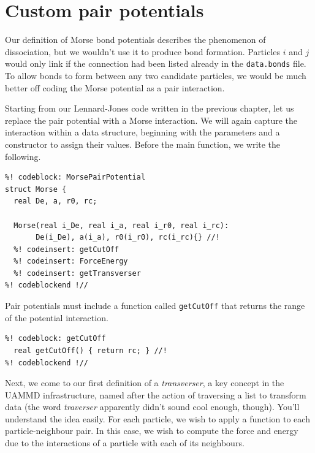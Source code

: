 \section{\label{Custom_pair_potentials}Custom pair potentials}

Our definition of Morse bond potentials describes the phenomenon of
dissociation, but we wouldn't use it to produce bond formation. Particles $i$
and $j$ would only link if the connection had been listed already in the
\texttt{data.bonds} file. To allow bonds to form between any two candidate
particles, we would be much better off coding the Morse potential as a pair
interaction.

Starting from our Lennard-Jones code written in the previous chapter, let us 
replace the pair potential with a Morse interaction. We will again capture the
interaction within a data structure, beginning with the parameters and a 
constructor to assign their values. Before the main function, we write the 
following.
\begin{lstlisting}
%! codeblock: MorsePairPotential
struct Morse {
  real De, a, r0, rc;

  Morse(real i_De, real i_a, real i_r0, real i_rc):
       De(i_De), a(i_a), r0(i_r0), rc(i_rc){} //!
  %! codeinsert: getCutOff
  %! codeinsert: ForceEnergy
  %! codeinsert: getTransverser
%! codeblockend !//
\end{lstlisting}
Pair potentials must include a function called \texttt{getCutOff} that returns
the range of the potential interaction.
\begin{lstlisting}
%! codeblock: getCutOff
  real getCutOff() { return rc; } //!
%! codeblockend !//
\end{lstlisting}

Next, we come to our first definition of a \textit{transverser}, a key concept 
in the UAMMD infrastructure, named after the action of traversing a list to 
transform data (the word \textit{traverser} apparently didn't sound cool enough, 
though). You'll understand the idea easily. For each particle, we wish to apply 
a function to each particle-neighbour pair. In this case, we wish to compute the 
force and energy due to the interactions of a particle with each of its 
neighbours.


